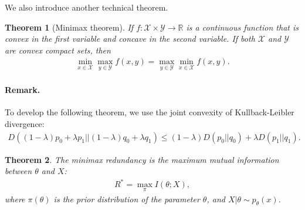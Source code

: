 \documentclass{article}
\numberwithin{equation}{section}
\newcommand{\bbR}{\mathbb{R}}
\renewcommand{\cal}{\mathcal}
\theoremstyle{plain}
\newtheorem{theorem}{Theorem}[section]
\theoremstyle{definition}
\begin{document}
We also introduce another technical theorem.
\begin{theorem}[Minimax theorem]\label{thm:2.10}
If $f:\cal{X}\times\cal{Y}\to\bbR$ is a continuous function that is convex in the first variable and concave in the second variable.  If both $\cal{X}$ and $\cal{Y}$ are convex compact sets, then
\begin{align*}
	\min_{x\in\cal{X}}\max_{y\in\cal{Y}}f(x,y)=\max_{y\in\cal{Y}}\min_{x\in\cal{X}}f(x,y).
\end{align*} 
\end{theorem}
\paragraph{Remark.} To develop the following theorem, we use the joint convexity of Kullback-Leibler divergence:
\begin{align*}
	D((1-\lambda)p_0 +\lambda p_1||(1-\lambda)q_0 +\lambda q_1)\leq(1-\lambda)D(p_0||q_0)+\lambda D(p_1||q_1).
\end{align*}
\begin{theorem}
The minimax redundancy is the maximum mutual information between $\theta$ and $X$:
\begin{align*}
	R^*=\max_{\pi}I(\theta;X),
\end{align*}
where $\pi(\theta)$ is the prior distribution of the parameter $\theta$, and $X|\theta\sim p_\theta(x)$.
\end{theorem}
\end{document}
